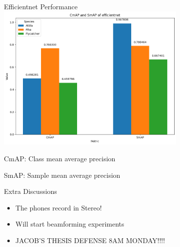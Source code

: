 \begin{frame}{Efficientnet Performance}
    \centering
    \includegraphics[height=0.7\textheight,width=0.7\textwidth,keepaspectratio]{images/cmap_smap_3species.png}

    CmAP: Class mean average precision

    SmAP: Sample mean average precision
\end{frame}

\begin{frame}{Extra Discussions}
    \begin{itemize}
        \item The phones record in Stereo!
        \item Will start beamforming experiments
        \item JACOB'S THESIS DEFENSE 8AM MONDAY!!!!
    \end{itemize}
\end{frame}



